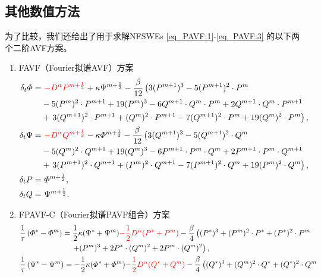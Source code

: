 \subsection{其他数值方法}
为了比较，我们还给出了用于求解NFSWEs \eqref{eq_PAVF:1}-\eqref{eq_PAVF:3} 的以下两个二阶AVF方案。
\begin{enumerate}[$\bullet$]
\item FAVF（Fourier拟谱AVF）方案
\begin{align}
\delta_{t} \varPhi =&~\textcolor[rgb]{1.00,0.00,0.00}{-D^{\alpha} P^{m+\frac{1}{2}}}+\kappa \Psi^{m+\frac{1}{2}}-\frac{\beta}{12}\left(3 (P^{m+1})^3-5 (P^{m+1})^2\cdot P^{m}\right.\nonumber\\
		&-5 (P^{m})^2\cdot P^{m+1}+19 (P^{m})^3-6 Q^{m+1}\cdot Q^{m}\cdot P^{m}+2 Q^{m+1}\cdot Q^{m}\cdot P^{m+1} \nonumber\\
		&+\left. 3 (Q^{m+1})^2\cdot P^{m+1}+(Q^{m})^2\cdot P^{m+1}-7 (Q^{m+1})^2\cdot P^{m}+19 (Q^{m} )^2\cdot P^{m}\right),\label{eq_PAVF:66}\\
\delta_{t} \Psi =&~\textcolor[rgb]{1.00,0.00,0.00}{-D^{\alpha} Q^{m+\frac{1}{2}}}-\kappa \varPhi^{m+\frac{1}{2}}-\frac{\beta}{12}\left(3 (Q^{m+1})^3-5 (Q^{m+1})^2\cdot Q^{m}\right.\nonumber\\
		&-5 (Q^{m})^2\cdot Q^{m+1}+19 (Q^{m})^3-6 P^{m+1}\cdot P^{m}\cdot Q^{m}+2 P^{m+1}\cdot P^{m}\cdot Q^{m+1} \nonumber\\
		&+\left. 3 (P^{m+1})^2\cdot Q^{m+1}+(P^{m})^2\cdot Q^{m+1}-7 (P^{m+1})^2\cdot Q^{m}+19 (P^{m} )^2\cdot Q^{m}\right),\label{eq_PAVF:67}\\
\delta_{t} P=&~\varPhi^{m+\frac{1}{2}},\label{eq_PAVF:68}\\
\delta_{t} Q=&~\Psi^{m+\frac{1}{2}}.\label{eq_PAVF:69}
\end{align}
\item FPAVF-C（Fourier拟谱PAVF组合）方案
\begin{align}
&\frac{1}{\tau}\left(\varPhi^{*}-\varPhi^{m}\right)=\frac{1}{2}\kappa(\Psi^{*}+\Psi^{m})\textcolor[rgb]{1.00,0.00,0.00}{-\frac{1}{2}D^{\alpha} (P^{*}+P^{m})}-\frac{\beta}{4}\left( (P^{*})^3+ (P^{m})^{2}\cdot P^{*}+(P^{*})^{2}\cdot P^{m}\right.\nonumber\\
		&~~~~~~~~~~~~~~~~~~~~\left.+ (P^{m})^{3}+2 P^{*}\cdot (Q^{m})^{2}+2 P^{m}\cdot (Q^{m})^{2}\right),\label{eq_PAVF:90}\\
&\frac{1}{\tau}\left(\Psi^{*}-\Psi^{m}\right)=-\frac{1}{2}\kappa (\varPhi^{*}+\varPhi^{m})\textcolor[rgb]{1.00,0.00,0.00}{-\frac{1}{2}D^{\alpha} (Q^{*}+Q^{m})}-\frac{\beta}{4}\left( (Q^{*})^3+ (Q^{m})^{2}\cdot Q^{*}+ (Q^{*})^{2}\cdot Q^{m}\right.\nonumber\\

\end{align}
\end{enumerate}
